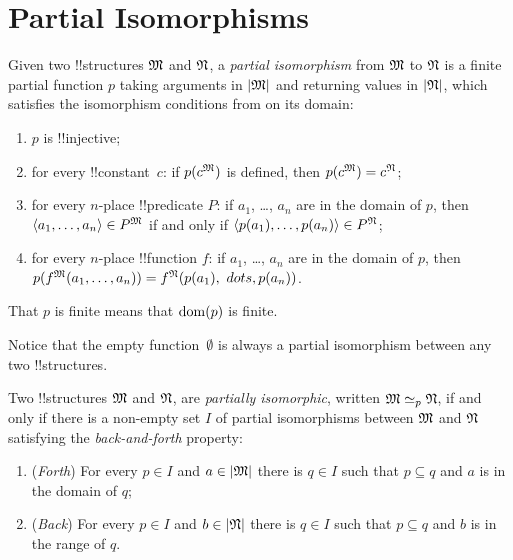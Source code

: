 \documentclass[../../include/open-logic-section]{subfiles}
\begin{document}
\section{Partial Isomorphisms}

\begin{defn}
  Given two !!{structure}s $\mathfrak M$ and $\mathfrak N$, a
  \emph{partial isomorphism} from $\mathfrak M$ to $\mathfrak N$ is a
  finite partial function $p$ taking arguments in $\left| \mathfrak M \right|$ and returning
  values in $\left| \mathfrak N \right|$, which satisfies the isomorphism conditions from
   on its domain:
  \begin{enumerate}
  \item $p$ is !!{injective};
  \item for every !!{constant}~$c$: if $p(c^{\mathfrak M})$ is defined,
    then $p(c^{\mathfrak M}) = c^{\mathfrak N}$;
  \item for every $n$-place !!{predicate} $P$: if $a_1$, \dots, $a_n$
    are in the domain of $p$, then $\langle a_1, \dots, a_n\rangle \in
    P^{\mathfrak M}$ if and only if $\langle p(a_1), \dots, p(a_n) \rangle
    \in P^{\mathfrak N}$;
  \item for every $n$-place !!{function} $f$: if $a_1$, \dots, $a_n$
    are in the domain of $p$, then $p(f^{\mathfrak M} (a_1, \dots,a_n))
    = f^{\mathfrak N} (p(a_1), \ dots, p(a_n))$.
  \end{enumerate}
  That $p$ is finite means that $\mathrm{dom}(p)$ is finite.
\end{defn}

Notice that the empty function~$\emptyset$ is always a partial
isomorphism between any two !!{structure}s.

\begin{defn}
  Two !!{structure}s $\mathfrak M$ and $\mathfrak N$, are
  \emph{partially isomorphic}, written $\Struct{M} \iso[p]
  \Struct{N}$, if and only if there is a non-empty set $I$
  of partial isomorphisms between $\mathfrak M$ and $\mathfrak N$
  satisfying the \emph{back-and-forth} property:
  \begin{enumerate}
  \item (\emph{Forth}) For every $p \in I$ and $a \in \left| \mathfrak M \right|$
    there is $q \in I$ such that $p \subseteq q$ and $a$ is
    in the domain of $q$;
  \item (\emph{Back}) For every $p \in I$ and $b \in \left| \mathfrak N \right|$
    there is $q \in I$ such that $p \subseteq q$ and $b$ is
    in the range of $q$.
  \end{enumerate}
\end{defn}
\end{document}
